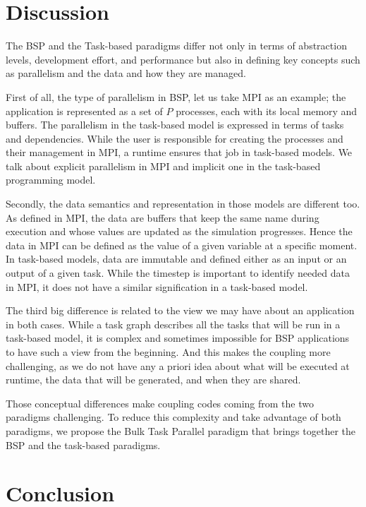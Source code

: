 \section{Discussion} \label{discussion}

The BSP and the Task-based paradigms differ not only in terms of abstraction levels, development effort, and performance but also in defining key concepts such as parallelism and the data and how they are managed.

First of all, the type of parallelism in BSP, let us take MPI as an example; the application is represented as a set of $P$ processes, each with its local memory and buffers. The parallelism in the task-based model is expressed in terms of tasks and dependencies. While the user is responsible for creating the processes and their management in MPI, a runtime ensures that job in task-based models. We talk about explicit parallelism in MPI and implicit one in the task-based programming model. 

Secondly, the data semantics and representation in those models are different too. As defined in MPI, the data are buffers that keep the same name during execution and whose values are updated as the simulation progresses. Hence the data in MPI can be defined as the value of a given variable at a specific moment.
In task-based models, data are immutable and defined either as an input or an output of a given task. While the timestep is important to identify needed data in MPI, it does not have a similar signification in a task-based model. 

The third big difference is related to the view we may have about an application in both cases. While a task graph describes all the tasks that will be run in a task-based model, it is complex and sometimes impossible for BSP applications to have such a view from the beginning. And this makes the coupling more challenging, as we do not have any a priori idea about what will be executed at runtime, the data that will be generated, and when they are shared.

Those conceptual differences make coupling codes coming from the two paradigms challenging. To reduce this complexity and take advantage of both paradigms, we propose the Bulk Task Parallel paradigm that brings together the BSP and the task-based paradigms. 


\section{Conclusion}



